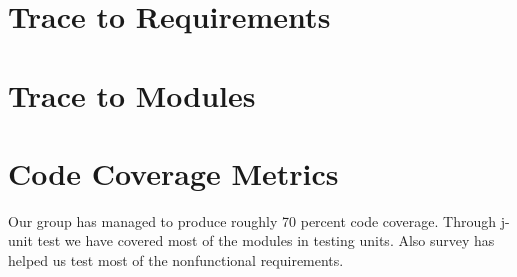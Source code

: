 \documentclass{article}
\begin{document}
\vspace{5mm}


\section{Trace to Requirements}
\section{Trace to Modules} 

\section{Code Coverage Metrics}
Our group has managed to produce roughly 70 percent code coverage. Through j-unit test we have covered most of the modules in testing units. Also survey has helped us test most of the nonfunctional requirements.
\end{document}
